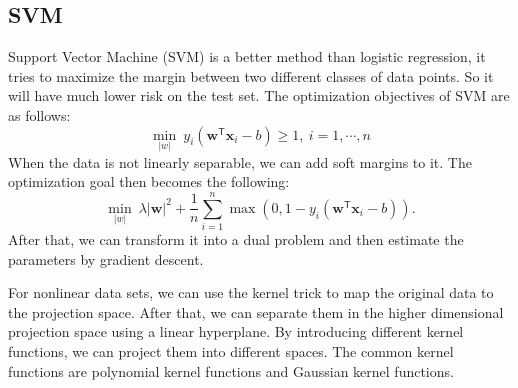 \documentclass[11pt, a4paper, jou]{apa7}
\begin{document}
\subsection{SVM}
    Support Vector Machine (SVM) is a better method than logistic regression, it tries to maximize the margin between two different classes of data points. So it will have much lower risk on the test set. The optimization objectives of SVM are as follows: 
    \begin{equation}
        \min_{|w|}\ y_{i}(\mathbf {w} ^{\mathsf {T}}\mathbf {x} _{i}-b)\geq 1,\ i=1, \cdots, n
    \end{equation}
    When the data is not linearly separable, we can add soft margins to it. The optimization goal then becomes the following: 
    \begin{equation}
        \min_{|w|}\ \lambda |\mathbf {w}| ^{2}+{\frac {1}{n}}\sum _{i=1}^{n}\max \left(0,1-y_{i}(\mathbf {w} ^{\mathsf {T}}\mathbf {x} _{i}-b)\right). 
    \end{equation}
    After that, we can transform it into a dual problem and then estimate the parameters by gradient descent. 

    For nonlinear data sets, we can use the kernel trick to map the original data to the projection space. After that, we can separate them in the higher dimensional projection space using a linear hyperplane. By introducing different kernel functions, we can project them into different spaces. The common kernel functions are polynomial kernel functions and Gaussian kernel functions. 
\end{document}
